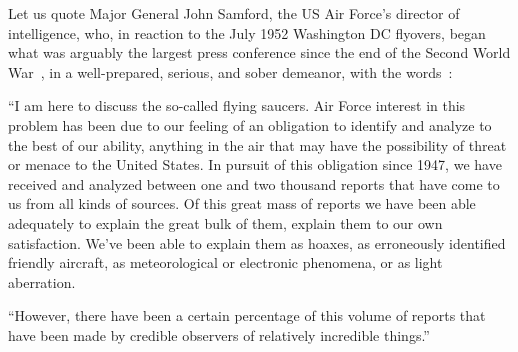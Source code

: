 Let us quote Major General John Samford, the US Air Force's director of intelligence, who,
in reaction to the July 1952 Washington DC flyovers,
began what was arguably the largest press conference since the end of the Second World War~\cite{Lewis-Kraus2021Apr},
in a well-prepared, serious, and sober demeanor, with the words~\cite{Archives1952,Samford1952}:
\begin{svgraybox}
``I am here to discuss the so-called flying saucers.
Air Force interest in this problem has been due to our feeling of an obligation to identify and analyze to the best of our ability,
anything in the air that may have the possibility of threat or menace to the United States.
In pursuit of this obligation since 1947,
we have received and analyzed between one and two thousand reports that have come to us from all kinds of sources.
Of this great mass of reports we have been able adequately to explain the great bulk of them, explain them to our own satisfaction.
We've been able to explain them as hoaxes, as erroneously identified friendly aircraft,
as meteorological or electronic phenomena, or as light aberration.

``However, there have been a certain percentage of this volume of reports that have been made by credible observers of relatively incredible things.''
\end{svgraybox}

